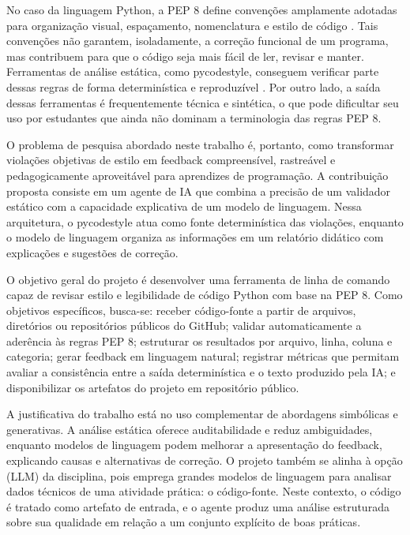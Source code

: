 \documentclass[12pt]{article}
\begin{document}
No caso da linguagem Python, a PEP 8 define convenções amplamente adotadas para
organização visual, espaçamento, nomenclatura e estilo de código
\cite{vanrossum2001pep8}. Tais convenções não garantem, isoladamente, a correção
funcional de um programa, mas contribuem para que o código seja mais fácil de
ler, revisar e manter. Ferramentas de análise estática, como
pycodestyle, conseguem verificar parte dessas regras de forma
determinística e reproduzível \cite{pycqa2026pycodestyle}. Por outro lado, a
saída dessas ferramentas é frequentemente técnica e sintética, o que pode
dificultar seu uso por estudantes que ainda não dominam a terminologia das
regras PEP 8.

O problema de pesquisa abordado neste trabalho é, portanto, como transformar
violações objetivas de estilo em feedback compreensível, rastreável e
pedagogicamente aproveitável para aprendizes de programação. A contribuição
proposta consiste em um agente de IA que combina a precisão de um validador
estático com a capacidade explicativa de um modelo de linguagem. Nessa
arquitetura, o pycodestyle atua como fonte determinística das violações,
enquanto o modelo de linguagem organiza as informações em um relatório didático
com explicações e sugestões de correção.

O objetivo geral do projeto é desenvolver uma ferramenta de linha de comando
capaz de revisar estilo e legibilidade de código Python com base na PEP 8. Como
objetivos específicos, busca-se: receber código-fonte a partir de arquivos,
diretórios ou repositórios públicos do GitHub; validar automaticamente a
aderência às regras PEP 8; estruturar os resultados por arquivo, linha, coluna e
categoria; gerar feedback em linguagem natural; registrar métricas que permitam
avaliar a consistência entre a saída determinística e o texto produzido pela IA;
e disponibilizar os artefatos do projeto em repositório público.

A justificativa do trabalho está no uso complementar de abordagens simbólicas e
generativas. A análise estática oferece auditabilidade e reduz ambiguidades,
enquanto modelos de linguagem podem melhorar a apresentação do feedback,
explicando causas e alternativas de correção. O projeto também se alinha à
opção (LLM) da disciplina, pois emprega grandes modelos de linguagem para
analisar dados técnicos de uma atividade prática: o código-fonte. Neste
contexto, o código é tratado como artefato de entrada, e o agente produz uma
análise estruturada sobre sua qualidade em relação a um conjunto explícito de
boas práticas.
\end{document}
